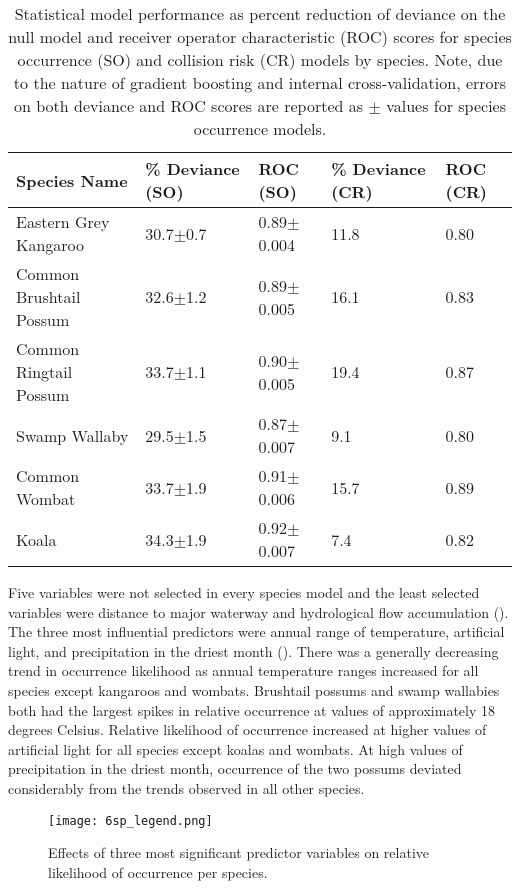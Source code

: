 \begin{table}[!t]
\caption[Statistical model performance for six mammal species]{Statistical model performance as percent reduction of deviance on the null model and receiver operator characteristic (ROC) scores for species occurrence (SO) and collision risk (CR) models by species. Note, due to the nature of gradient boosting and internal cross-validation, errors on both deviance and ROC scores are reported as $\pm$ values for species occurrence models.}
\centering
\begin{tabularx}{0.9\textwidth}{lllll} \toprule
Species Name			&\% Deviance (SO)	&ROC (SO)			&\% Deviance (CR)	&ROC (CR)\\
\midrule 
Eastern Grey Kangaroo	& 30.7$\pm$0.7 		& 0.89$\pm$0.004	& 11.8 				& 0.80 \\ 
Common Brushtail Possum & 32.6$\pm$1.2 		& 0.89$\pm$0.005 	& 16.1 				& 0.83 \\ 
Common Ringtail Possum 	& 33.7$\pm$1.1 		& 0.90$\pm$0.005 	& 19.4 				& 0.87 \\ 
Swamp Wallaby		 	& 29.5$\pm$1.5 		& 0.87$\pm$0.007 	& 9.1 				& 0.80 \\ 
Common Wombat 			& 33.7$\pm$1.9 		& 0.91$\pm$0.006 	& 15.7 				& 0.89 \\ 
Koala 					& 34.3$\pm$1.9 		& 0.92$\pm$0.007 	& 7.4 				& 0.82 \\ 
\bottomrule
\end{tabularx}
\label{6sp_models}
\end{table}

Five variables were not selected in every species model and the least selected variables were distance to major waterway and hydrological flow accumulation (). The three most influential predictors were annual range of temperature, artificial light, and precipitation in the driest month (). There was a generally decreasing trend in occurrence likelihood as annual temperature ranges increased for all species except kangaroos and wombats. Brushtail possums and swamp wallabies both had the largest spikes in relative occurrence at values of approximately 18 degrees Celsius. Relative likelihood of occurrence increased at higher values of artificial light for all species except koalas and wombats. At high values of precipitation in the driest month, occurrence of the two possums deviated considerably from the trends observed in all other species. 

\begin{figure*}[!t]
  \centering
  \texttt{[image: 6sp\_legend.png]}\\
  \caption[Most significant predictor variables on relative likelihood of occurrence for six mammal species]{Effects of three most significant predictor variables on relative likelihood of occurrence per species.}
  \label{6sp_term_occ}
\end{figure*}


